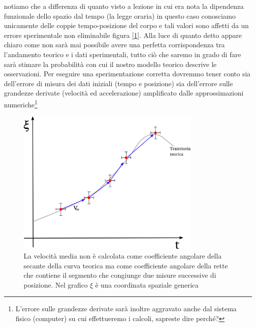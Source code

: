 \documentclass[a4paper,10pt,oneside]{article}
\begin{document}
notiamo che a differenza di quanto visto a lezione in cui era nota la dipendenza funzionale dello spazio dal tempo (la legge oraria) in questo caso conosciamo unicamente delle coppie tempo-posizione del corpo e tali valori sono affetti da un errore sperimentale non eliminabile figura [\ref{fig:velocita_numerica}]. Alla luce di quanto detto appare chiaro come non sarà mai possibile avere una perfetta corrispondenza tra l'andamento teorico e i dati sperimentali, tutto ciò che saremo in grado di fare sarà stimare la probabilità con cui il nostro modello teorico descrive le osservazioni. Per eseguire una sperimentazione corretta dovremmo tener conto sia dell'errore di misura dei dati iniziali (tempo e posizione) sia dell'errore sulle grandezze derivate (velocità ed accelerazione) amplificato dalle approssimazioni numeriche\footnote{L'errore sulle grandezze derivate sarà inoltre aggravato anche dal sistema fisico (computer) su cui effettueremo i calcoli, sapreste dire perché?}


\begin{figure}[H]
 \centering
 \includegraphics[width=0.8\textwidth]{./immagini/velcita_numerica.png}
 \caption{La velocità media non è calcolata come coefficiente angolare della secante della curva teorica ma come coefficiente angolare della rette che contiene il segmento che congiunge due misure successive di posizione. Nel grafico $\xi$ è una coordinata spaziale generica}
 \label{fig:velocita_numerica}
\end{figure}
\end{document}
